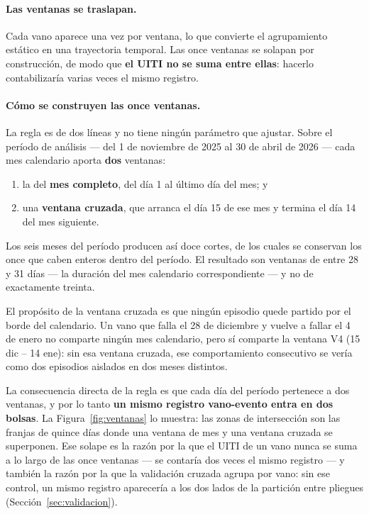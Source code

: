 \documentclass[11pt,a4paper]{article}
\begin{document}
\paragraph{Las ventanas se traslapan.} Cada vano aparece una vez por ventana, lo que convierte
el agrupamiento estático en una trayectoria temporal. Las once ventanas se solapan por
construcción, de modo que \textbf{el UITI no se suma entre ellas}: hacerlo contabilizaría varias
veces el mismo registro.

\begin{bloquenuevo}
\paragraph{Cómo se construyen las once ventanas.} La regla es de dos líneas y no tiene ningún
parámetro que ajustar. Sobre el período de análisis --- del 1 de noviembre de 2025 al 30 de
abril de 2026 --- cada mes calendario aporta \textbf{dos} ventanas:

\begin{enumerate}[itemsep=0.15em]
  \item la del \textbf{mes completo}, del día 1 al último día del mes; y
  \item una \textbf{ventana cruzada}, que arranca el día 15 de ese mes y termina el día 14 del
        mes siguiente.
\end{enumerate}

Los seis meses del período producen así doce cortes, de los cuales se conservan los once que
caben enteros dentro del período. El resultado son ventanas de entre 28 y 31 días --- la
duración del mes calendario correspondiente --- y no de exactamente treinta.

El propósito de la ventana cruzada es que ningún episodio quede partido por el borde del
calendario. Un vano que falla el 28 de diciembre y vuelve a fallar el 4 de enero no comparte
ningún mes calendario, pero sí comparte la ventana V4 (15 dic -- 14 ene): sin esa ventana
cruzada, ese comportamiento consecutivo se vería como dos episodios aislados en dos meses
distintos.

La consecuencia directa de la regla es que cada día del período pertenece a dos ventanas, y por
lo tanto \textbf{un mismo registro vano-evento entra en dos bolsas}. La
Figura~\ref{fig:ventanas} lo muestra: las zonas de intersección son las franjas de quince días
donde una ventana de mes y una ventana cruzada se superponen. Ese solape es la razón por la que
el UITI de un vano nunca se suma a lo largo de las once ventanas --- se contaría dos veces el
mismo registro --- y también la razón por la que la validación cruzada agrupa por vano: sin ese
control, un mismo registro aparecería a los dos lados de la partición entre pliegues
(Sección~\ref{sec:validacion}).


\end{bloquenuevo}
\end{document}
